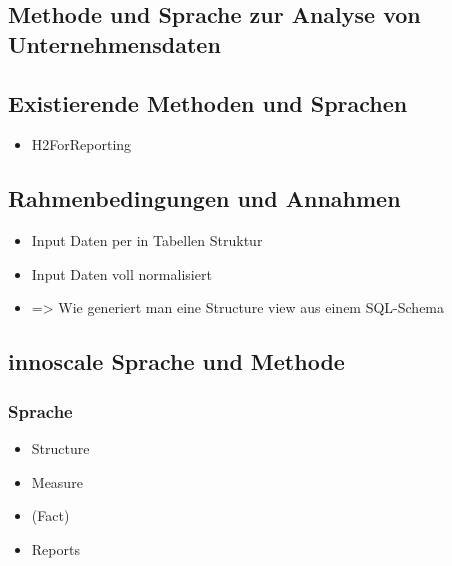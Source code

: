 \documentclass[
  language=german, %
  type=bachelor%
]{isthesis}
\begin{document}
\begin{content}
% 



  



  \chapter{Methode und Sprache zur Analyse von Unternehmensdaten}
  \section{Existierende Methoden und Sprachen}
  \begin{itemize}
    \item H2ForReporting
  \end{itemize}

  \section{Rahmenbedingungen und Annahmen}
  \begin{itemize}
    \item Input Daten per in Tabellen Struktur
    \item Input Daten voll normalisiert
    \item => Wie generiert man eine Structure view aus einem SQL-Schema
  \end{itemize}

  \section{innoscale Sprache und Methode}
  \subsection{Sprache}
  \begin{itemize}
    \item Structure
    \item Measure
    \item (Fact)
    \item Reports
  \end{itemize}


\end{content}
\end{document}
